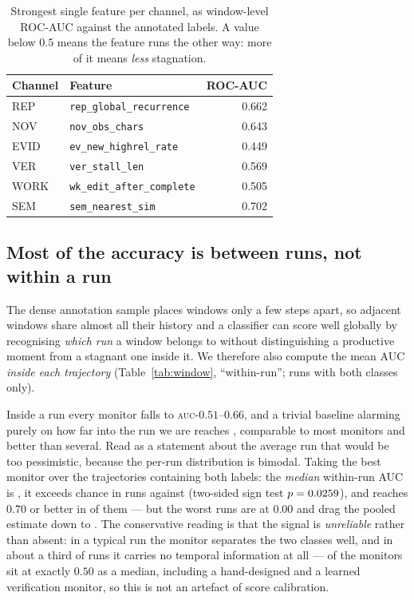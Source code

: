 \begin{table}[t]\centering\small
\caption{Strongest single feature per channel, as window-level ROC-AUC against the annotated labels. A
value below $0.5$ means the feature runs the other way: more of it means \emph{less} stagnation.}
\label{tab:evidence}
\begin{tabular}{llr}\toprule
Channel & Feature & ROC-AUC \\ \midrule
REP & \texttt{rep\_global\_recurrence} & 0.662 \\
NOV & \texttt{nov\_obs\_chars} & 0.643 \\
EVID & \texttt{ev\_new\_highrel\_rate} & 0.449 \\
VER & \texttt{ver\_stall\_len} & 0.569 \\
WORK & \texttt{wk\_edit\_after\_complete} & 0.505 \\
SEM & \texttt{sem\_nearest\_sim} & 0.702 \\
\bottomrule\end{tabular}\end{table}

\subsection{Most of the accuracy is between runs, not within a run}
\label{sec:res-within}
The dense annotation sample places windows only a few steps apart, so adjacent windows share almost all
their history and a classifier can score well globally by recognising \emph{which run} a window belongs to
without distinguishing a productive moment from a stagnant one inside it. We therefore also compute the
mean AUC \emph{inside each trajectory} (Table~\ref{tab:window}, ``within-run''; runs with both classes
only).

Inside a run every monitor falls to \textsc{auc}-$0.51$--$0.66$, and a trivial baseline alarming purely on
how far into the run we are reaches \pwithinBOnestepThreeZero{}, comparable to most monitors and better
than several. Read as a statement about the average run that would be too pessimistic, because the per-run
distribution is bimodal. Taking the best monitor over the \pwithinRunsBfourSemanticStrict{} trajectories
containing both labels: the \emph{median} within-run AUC is \pwithinMedianBfourSemanticStrict{}, it exceeds
chance in \pwithinWinsBfourSemanticStrict{} runs against \pwithinLossesBfourSemanticStrict{} (two-sided
sign test $p=0.0259{}$), and reaches $0.70$ or better in
\pwithinHighBfourSemanticStrict{} of them --- but the worst runs are at $0.00$ and drag the pooled estimate
down to \pwithinBFoursemantic{}. The conservative reading is that the signal is \emph{unreliable} rather
than absent: in a typical run the monitor separates the two classes well, and in about a third of runs it
carries no temporal information at all --- \pwithinTieMonitors{} of the \pnMonitors{} monitors sit at
exactly $0.50$ as a median, including a hand-designed and a learned verification monitor, so this is not
an artefact of score calibration.

